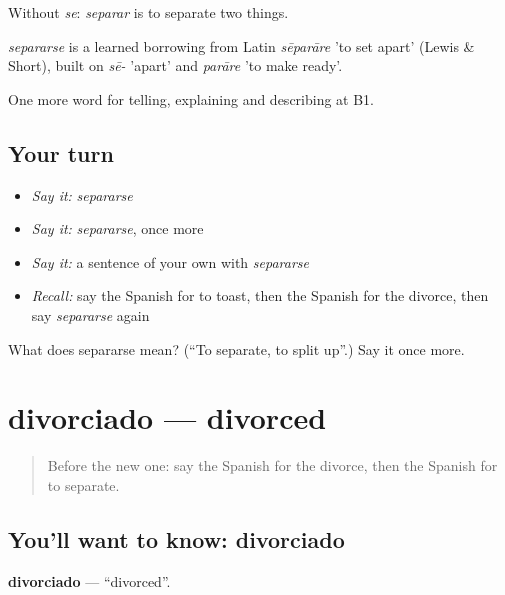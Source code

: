 Without \emph{se}: \emph{separar} is to separate two things.

\begin{cousinweb}
\emph{separarse} is a learned borrowing from Latin \emph{sēparāre} 'to set apart' (Lewis \& Short), built on \emph{sē-} 'apart' and \emph{parāre} 'to make ready'.
\end{cousinweb}

\begin{grammarlens}[title={What you've built}]
One more word for telling, explaining and describing at B1.
\end{grammarlens}

\subsection*{Your turn}
\begin{itemize}
\raggedright
  \item \emph{Say it:} \emph{separarse}
  \item \emph{Say it:} \emph{separarse}, once more
  \item \emph{Say it:} a sentence of your own with \emph{separarse}
  \item \emph{Recall:} say the Spanish for to toast, then the Spanish for the divorce, then say \emph{separarse} again
\end{itemize}

\begin{tcolorbox}[breakable,colback=teal!4,colframe=teal!35!black,title={Before you move on}]
What does separarse mean? (\textquotedblleft{}To separate, to split up\textquotedblright{}.) Say it once more.
\end{tcolorbox}
\section[divorciado]{divorciado — divorced}

\label{lesson:ES-C550-divorciado}



\begin{quote}
Before the new one: say the Spanish for the divorce, then the Spanish for to separate.
\end{quote}

\subsection*{You'll want to know: divorciado}
\textbf{divorciado} — \textquotedblleft{}divorced\textquotedblright{}.

